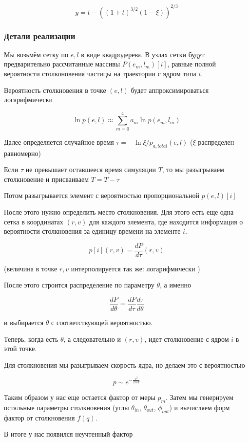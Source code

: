 $$
	y = t - \left( (1+t)^{3/2} (1-\xi) \right)^{2/3}
$$

\subsubsection{Детали реализации}

Мы возьмём сетку по $e,l$ в виде квадродерева.
В узлах сетки будут предварительно рассчитанные массивы $P(e_m,l_m)[i]$, равные 
полной вероятности столконовения частицы на траектории с ядром типа $i$.

Вероятность столкновения в точке $(e,l)$ будет аппроксимироваться логарифмически

\[	
	\ln p(e,l) \approx \sum_{m=0}^{4}{a_m \ln p(e_m,l_m)}
\]

Далее определяется случайное время $\tau = -\ln \xi / {p_{a, total}(e,l)}$ ($\xi$ распределен равномерно)

Если $\tau$ не превышает оставшееся время симуляции $T$, то мы разыгрываем столкновение
и присваиваем $T = T - \tau$

Потом разыгрывается элемент с вероятностью пропорциональной $p(e,l)[i]$

После этого нужно определить место столкновения. Для этого есть еще одна сетка в координатах
$(r,v)$ для каждого элемента, где находится информация о вероятности столкновения за единицу времени на элементе $i$.

\[
	p[i](r,v) = \frac{dP}{d\tau}(r,v)
\]

(величина в точке $r,v$ интерполируется так же: логарифмически )

После этого строится распределение по параметру $\theta$, а именно

\[
	\frac{dP}{d\theta} = \frac{dP}{d\tau} \frac{d\tau}{d\theta}
\]

и выбирается  $\theta$ с соответствующей вероятностью.

Теперь, когда есть $\theta$, а следовательно и $(r,v)$, идет столкновение с ядром $i$ в этой точке.

Для столкновения мы разыгрываем скорость ядра, но делаем это с вероятностью 

\[
	p \sim e^{-\frac{v^2}{2mT}}
\]

Таким образом у нас еще остается фактор от меры $p_m$. Затем мы генерируем остальные параметры столкновения (углы $\theta_{in}$, $\theta_{out}$, $\phi_{out}$) и вычисляем форм фактор от столкновения $f(q)$.

В итоге у нас появился неучтенный фактор 

